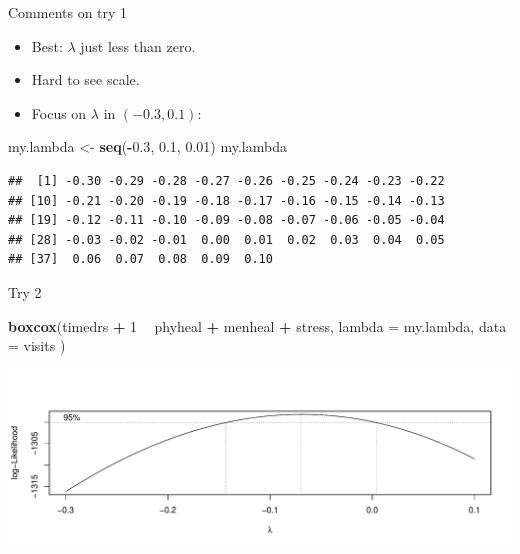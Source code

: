 \documentclass[
  ignorenonframetext,
]{beamer}
\newenvironment{Shaded}{\begin{snugshade}}{\end{snugshade}}
\newcommand{\DataTypeTok}[1]{\textcolor[rgb]{0.13,0.29,0.53}{#1}}
\newcommand{\DecValTok}[1]{\textcolor[rgb]{0.00,0.00,0.81}{#1}}
\newcommand{\FloatTok}[1]{\textcolor[rgb]{0.00,0.00,0.81}{#1}}
\newcommand{\KeywordTok}[1]{\textcolor[rgb]{0.13,0.29,0.53}{\textbf{#1}}}
\newcommand{\NormalTok}[1]{#1}
\newcommand{\OperatorTok}[1]{\textcolor[rgb]{0.81,0.36,0.00}{\textbf{#1}}}
\newcommand{\StringTok}[1]{\textcolor[rgb]{0.31,0.60,0.02}{#1}}
\begin{document}
\begin{frame}[fragile]{Comments on try 1}
\protect\hypertarget{comments-on-try-1}{}

\begin{itemize}
\item
  Best: \(\lambda\) just less than zero.
\item
  Hard to see scale.
\item
  Focus on \(\lambda\) in \((-0.3,0.1)\):
\end{itemize}

\footnotesize

\begin{Shaded}
\begin{Highlighting}[]
\NormalTok{my.lambda <-}\StringTok{ }\KeywordTok{seq}\NormalTok{(}\OperatorTok{-}\FloatTok{0.3}\NormalTok{, }\FloatTok{0.1}\NormalTok{, }\FloatTok{0.01}\NormalTok{)}
\NormalTok{my.lambda}
\end{Highlighting}
\end{Shaded}

\begin{verbatim}
##  [1] -0.30 -0.29 -0.28 -0.27 -0.26 -0.25 -0.24 -0.23 -0.22
## [10] -0.21 -0.20 -0.19 -0.18 -0.17 -0.16 -0.15 -0.14 -0.13
## [19] -0.12 -0.11 -0.10 -0.09 -0.08 -0.07 -0.06 -0.05 -0.04
## [28] -0.03 -0.02 -0.01  0.00  0.01  0.02  0.03  0.04  0.05
## [37]  0.06  0.07  0.08  0.09  0.10
\end{verbatim}

\normalsize

\end{frame}

\begin{frame}[fragile]{Try 2}
\protect\hypertarget{try-2}{}

\begin{Shaded}
\begin{Highlighting}[]
\KeywordTok{boxcox}\NormalTok{(timedrs }\OperatorTok{+}\StringTok{ }\DecValTok{1} \OperatorTok{~}\StringTok{ }\NormalTok{phyheal }\OperatorTok{+}\StringTok{ }\NormalTok{menheal }\OperatorTok{+}\StringTok{ }\NormalTok{stress,}
  \DataTypeTok{lambda =}\NormalTok{ my.lambda,}
  \DataTypeTok{data =}\NormalTok{ visits}
\NormalTok{)}
\end{Highlighting}
\end{Shaded}

\includegraphics{slides_d29_files/figure-beamer/unnamed-chunk-64-1.pdf}

\end{frame}
\end{document}
